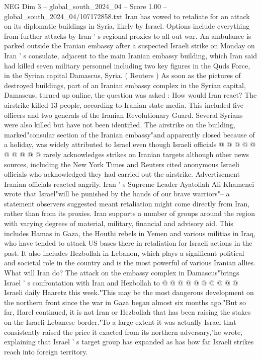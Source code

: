 \begin{textsample}{NEG Dim 3 – global\_south\_2024\_04 – Score 1.00 – global\_south\_2024\_04/107172858.txt}  \label{ex:f3_neg_269}
Iran has vowed to retaliate for an attack on its diplomatic buildings in Syria, likely by Israel.
Options include everything from further attacks by Iran ' s regional proxies to all-out war.
An ambulance is parked outside the Iranian embassy after a suspected Israeli strike on Monday on Iran ' s consulate, adjacent to the main Iranian embassy building, which Iran said had killed seven military personnel including two key figures in the Quds Force, in the Syrian capital Damascus, Syria. ( Reuters ) As soon as the pictures of destroyed buildings, part of an Iranian embassy complex in the Syrian capital, Damascus, turned up online, the question was asked : How would Iran react?
The airstrike killed 13 people, according to Iranian state media.
This included five officers and two generals of the Iranian Revolutionary Guard.
Several Syrians were also killed but have not been identified.
The airstrike on the building, marked"consular section of the Iranian embassy"and apparently closed because of a holiday, was widely attributed to Israel even though Israeli officials @ @ @ @ @ @ @ @ @ @ rarely acknowledges strikes on Iranian targets although other news sources, including the New York Times and Reuters cited anonymous Israeli officials who acknowledged they had carried out the airstrike.
Advertisement Iranian officials reacted angrily.
Iran ' s Supreme Leader Ayatollah Ali Khamenei wrote that Israel"will be punished by the hands of our brave warriors"-- a statement observers suggested meant retaliation might come directly from Iran, rather than from its proxies.
Iran supports a number of groups around the region with varying degrees of material, military, financial and advisory aid.
This includes Hamas in Gaza, the Houthi rebels in Yemen and various militias in Iraq, who have tended to attack US bases there in retaliation for Israeli actions in the past.
It also includes Hezbollah in Lebanon, which plays a significant political and societal role in the country and is the most powerful of various Iranian allies.
What will Iran do?
The attack on the embassy complex in Damascus"brings Israel ' s confrontation with Iran and Hezbollah to @ @ @ @ @ @ @ @ @ @ Israeli daily Haaretz this week."This may be the most dangerous development on the northern front since the war in Gaza began almost six months ago."But so far, Harel continued, it is not Iran or Hezbollah that has been raising the stakes on the Israeli-Lebanese border."To a large extent it was actually Israel that consistently raised the price it exacted from its northern adversary,"he wrote, explaining that Israel ' s target group has expanded as has how far Israeli strikes reach into foreign territory.

\end{textsample}
